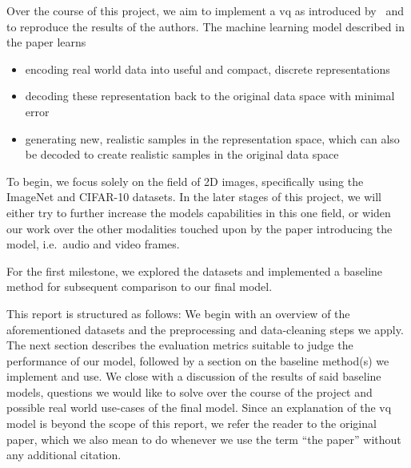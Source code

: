Over the course of this project, we aim to implement a \ac{vq} as introduced by~\cite{vqvae}
and to reproduce the results of the authors.
The machine learning model described in the paper learns
\begin{itemize}
    \item encoding real world data into useful and compact, discrete representations
    \item decoding these representation back to the original data space with minimal error
    \item generating new, realistic samples in the representation space, which can also be decoded to create realistic
    samples in the original data space
\end{itemize}
To begin, we focus solely on the field of 2D images, specifically using the ImageNet and CIFAR-10 datasets.
In the later stages of this project, we will either try to further increase the models capabilities in this one field,
or widen our work over the other modalities touched upon by the paper introducing the model, i.e.\ audio and video
frames.

For the first milestone, we explored the datasets and implemented a baseline method for subsequent comparison to our
final model.

This report is structured as follows: We begin with an overview of the aforementioned datasets and the preprocessing and
data-cleaning steps we apply.
The next section describes the evaluation metrics suitable to judge the performance of our model, followed by a
section on the baseline method(s) we implement and use.
We close with a discussion of the results of said baseline models, questions we would like to solve over the course of
the project and possible real world use-cases of the final model.
Since an explanation of the \ac{vq} model is beyond the scope of this report, we refer the reader to the original paper,
which we also mean to do whenever we use the term ``the paper'' without any additional citation.